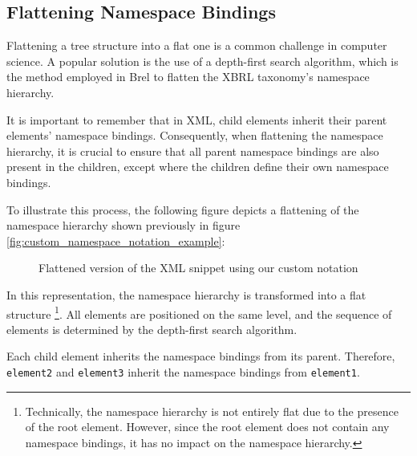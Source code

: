 \subsection{Flattening Namespace Bindings}


Flattening a tree structure into a flat one is a common challenge in computer science.
A popular solution is the use of a depth-first search algorithm,
which is the method employed in Brel to flatten the XBRL taxonomy's namespace hierarchy.

It is important to remember that in XML, child elements inherit their parent elements' namespace bindings.
Consequently, when flattening the namespace hierarchy,
it is crucial to ensure that all parent namespace bindings are also present in the children,
except where the children define their own namespace bindings.

To illustrate this process, the following figure depicts a flattening of the namespace hierarchy shown previously in figure \ref{fig:custom_namespace_notation_example}:

\begin{figure}[H]
    \caption{Flattened version of the XML snippet using our custom notation}
    \label{fig:custom_namespace_notation_example_flattened}
\end{figure}

In this representation, the namespace hierarchy is transformed into a flat structure
\footnote{Technically, the namespace hierarchy is not entirely flat due to the presence of the root element.
However, since the root element does not contain any namespace bindings, it has no impact on the namespace hierarchy.}.
All elements are positioned on the same level, and the sequence of elements is determined by the depth-first search algorithm.

Each child element inherits the namespace bindings from its parent.
Therefore, \texttt{element2} and \texttt{element3} inherit the namespace bindings from \texttt{element1}.

